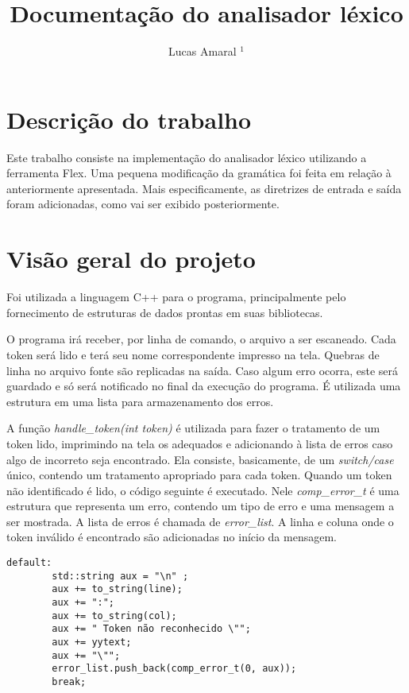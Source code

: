 \documentclass[11pt]{article}
\title{Documentação do analisador léxico}
\author{Lucas Amaral $^1$}
\begin{document}
\maketitle


\section{Descrição do trabalho}

Este trabalho consiste na implementação do analisador léxico utilizando a ferramenta Flex.
Uma pequena modificação da gramática foi feita em relação à anteriormente apresentada. 
Mais especificamente, as diretrizes de entrada e saída foram adicionadas, 
como vai ser exibido posteriormente.

\section{Visão geral do projeto}

Foi utilizada a linguagem C++ para o programa, principalmente pelo fornecimento de estruturas
de dados prontas em suas bibliotecas. 

O programa irá receber, por linha de comando, o arquivo a ser escaneado. Cada token será
lido e terá seu nome correspondente impresso na tela. 
Quebras de linha no arquivo fonte são replicadas na saída. 
Caso algum erro ocorra, este será guardado e só será notificado no final da 
execução do programa. É utilizada uma estrutura em uma lista para armazenamento dos erros.

A função \emph{handle\_token(int token)} é utilizada para fazer o tratamento de um token lido,
imprimindo na tela os adequados e adicionando à lista de erros caso algo de incorreto seja
encontrado. Ela consiste, basicamente, de um \emph{switch/case} único, contendo um tratamento
apropriado para cada token. Quando um token não identificado é lido, o código seguinte é 
executado. Nele \emph{comp\_error\_t} é uma estrutura que representa um erro, contendo um tipo de
erro e uma mensagem a ser mostrada. A lista de erros é chamada de \emph{error\_list}. A linha
e coluna onde o token inválido é encontrado são adicionadas no início da mensagem.


\begin{lstlisting}[basicstyle=\small]
    default:
        std::string aux = "\n" ;
        aux += to_string(line);
        aux += ":";
        aux += to_string(col);
        aux += " Token não reconhecido \"";
        aux += yytext;
        aux += "\"";
        error_list.push_back(comp_error_t(0, aux));
        break;
\end{lstlisting}
\end{document}
